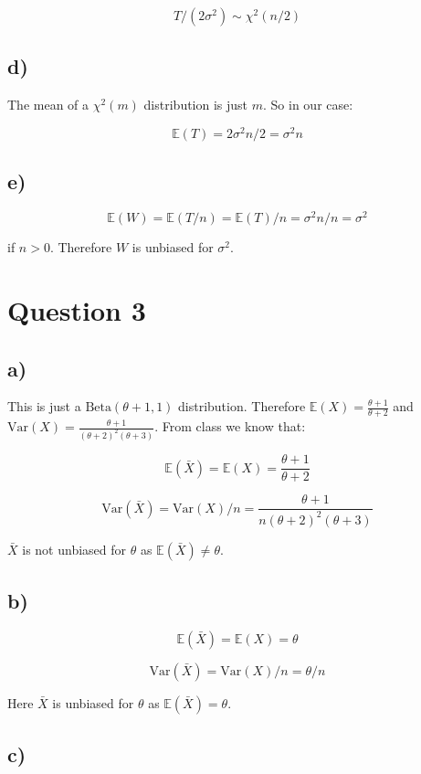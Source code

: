 \documentclass[11pt]{article}
\begin{document}
$$T/(2\sigma^2)\sim \chi^2 (n/2)$$

\subsection*{d)}

The mean of a $\chi^2(m)$ distribution is just $m$. So in our case:

$$\mathbb{E}(T) = 2\sigma^2 n/2=\sigma^2n$$

\subsection*{e)}

$$\mathbb{E}(W) = \mathbb{E}(T/n) = \mathbb{E}(T)/n = \sigma^2n/n = \sigma^2$$

if $n>0$. Therefore $W$ is unbiased for $\sigma^2$. 


\section*{Question 3}

\subsection*{a)}

This is just a $\text{Beta}(\theta + 1, 1)$ distribution. Therefore $\mathbb{E}(X)=\frac{\theta + 1}{\theta + 2}$ and $\text{Var}(X) = \frac{\theta + 1}{(\theta + 2)^2(\theta + 3)}$. From class we know that:

$$\mathbb{E}(\bar{X}) = \mathbb{E}(X) = \frac{\theta + 1}{\theta + 2}$$

$$\text{Var}(\bar{X}) = \text{Var}(X)/n = \frac{\theta + 1}{n(\theta + 2)^2(\theta + 3)}$$

$\bar{X}$ is not unbiased for $\theta$ as $\mathbb{E}(\bar{X}) \neq \theta$. 

\subsection*{b)}

$$\mathbb{E}(\bar{X}) = \mathbb{E}(X) = \theta$$

$$\text{Var}(\bar{X}) = \text{Var}(X)/n = \theta/n$$

Here $\bar{X}$ is unbiased for $\theta$ as $\mathbb{E}(\bar{X}) = \theta$. 

\subsection*{c)}
\end{document}
